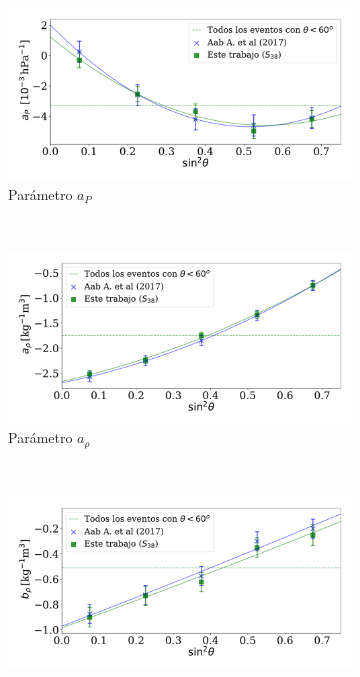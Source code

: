        \begin{figure}[H]
        \centering
           \begin{subfigure}[b]{0.73\textwidth}
           \includegraphics[width=\linewidth]{Graphs/params/ap_ICRC_2019_S38_above_0EeV.pdf}
           \caption{Parámetro $a_P$ }
           \label{fig:ap_2019_S38}
           \end{subfigure}\\%
           \begin{subfigure}[b]{0.73\textwidth}
           \includegraphics[width=\linewidth]{Graphs/params/arho_ICRC_2019_S38_above_0EeV.pdf}
           \caption{Parámetro $a_{\rho}$ }
           \label{fig:arho_2019_S38}
           \end{subfigure}\\%
           \begin{subfigure}[b]{\textwidth}
           \centering
           \includegraphics[width=0.73\linewidth]{Graphs/params/brho_ICRC_2019_S38_above_0EeV.pdf}

\end{subfigure}
\end{figure}
